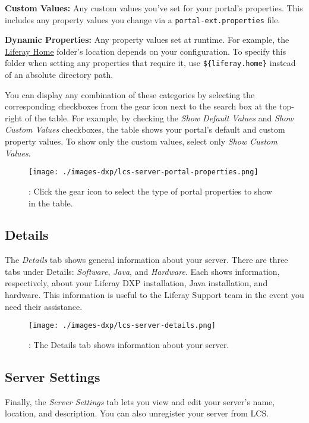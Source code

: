 \textbf{Custom Values:} Any custom values you've set for your portal's
properties. This includes any property values you change via a
\texttt{portal-ext.properties} file.

\textbf{Dynamic Properties:} Any property values set at runtime. For
example, the
\href{/docs/7-0/deploy/-/knowledge_base/d/installing-product\#liferay-home}{Liferay
Home} folder's location depends on your configuration. To specify this
folder when setting any properties that require it, use
\texttt{\$\{liferay.home\}} instead of an absolute directory path.

You can display any combination of these categories by selecting the
corresponding checkboxes from the gear icon next to the search box at
the top-right of the table. For example, by checking the \emph{Show
Default Values} and \emph{Show Custom Values} checkboxes, the table
shows your portal's default and custom property values. To show only the
custom values, select only \emph{Show Custom Values}.

\begin{figure}
\centering
\texttt{[image: ./images-dxp/lcs-server-portal-properties.png]}
\caption{: Click the gear icon to select the type of portal properties
to show in the table.}
\end{figure}

\subsection{Details}\label{details}

The \emph{Details} tab shows general information about your server.
There are three tabs under Details: \emph{Software}, \emph{Java}, and
\emph{Hardware}. Each shows information, respectively, about your
Liferay DXP installation, Java installation, and hardware. This
information is useful to the Liferay Support team in the event you need
their assistance.

\begin{figure}
\centering
\texttt{[image: ./images-dxp/lcs-server-details.png]}
\caption{: The Details tab shows information about your server.}
\end{figure}

\subsection{Server Settings}\label{server-settings}

Finally, the \emph{Server Settings} tab lets you view and edit your
server's name, location, and description. You can also unregister your
server from LCS.

